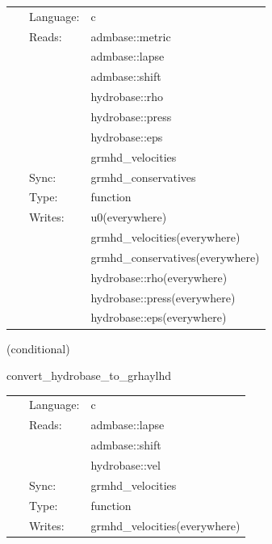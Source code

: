 \documentclass{article}
\begin{document}
\hspace{5mm}

 \begin{tabular*}{160mm}{cll} 
~ & Language:  & c \\ 
~ & Reads:  & admbase::metric \\ 
~& ~ &admbase::lapse\\ 
~& ~ &admbase::shift\\ 
~& ~ &hydrobase::rho\\ 
~& ~ &hydrobase::press\\ 
~& ~ &hydrobase::eps\\ 
~& ~ &grmhd\_velocities\\ 
~ & Sync:  & grmhd\_conservatives \\ 
~ & Type:  & function \\ 
~ & Writes:  & u0(everywhere) \\ 
~& ~ &grmhd\_velocities(everywhere)\\ 
~& ~ &grmhd\_conservatives(everywhere)\\ 
~& ~ &hydrobase::rho(everywhere)\\ 
~& ~ &hydrobase::press(everywhere)\\ 
~& ~ &hydrobase::eps(everywhere)\\ 
\end{tabular*} 


\vspace{5mm}

   (conditional) 

\hspace{5mm} convert\_hydrobase\_to\_grhaylhd 

\hspace{5mm}{\it convert hydrobase initial data to grhaylhd variables } 


\hspace{5mm}

 \begin{tabular*}{160mm}{cll} 
~ & Language:  & c \\ 
~ & Reads:  & admbase::lapse \\ 
~& ~ &admbase::shift\\ 
~& ~ &hydrobase::vel\\ 
~ & Sync:  & grmhd\_velocities \\ 
~ & Type:  & function \\ 
~ & Writes:  & grmhd\_velocities(everywhere) \\ 
\end{tabular*} 
\end{document}
